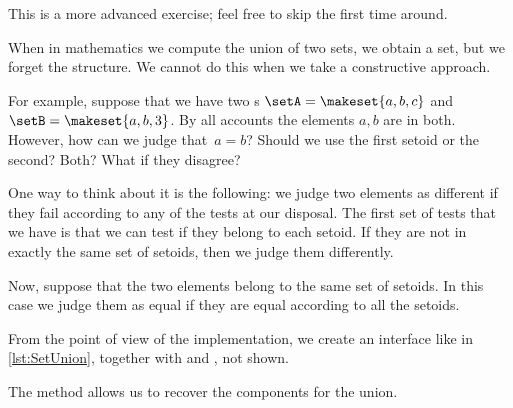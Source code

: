 \begin{remark}
    This is a more advanced exercise; feel free to skip the first time around.
\end{remark}

When in mathematics we compute the union of two sets, we obtain a set, but we forget the structure.
We cannot do this when we take a constructive approach.

For example, suppose that we have two \Setoid{}s $\setA = \makeset{a,b,c}$ and~$\setB = \makeset{a,b,3}$.
By all accounts the elements $a,b$ are in both.
However, how can we judge that~$a=b$?
Should we use the first setoid or the second?
Both?
What if they disagree?

One way to think about it is the following: we judge two elements as different if they fail according to any of the tests at our disposal. The first set of tests that we have is that we can test if they belong to each setoid.
If they are not in exactly the same set of setoids, then we judge them differently.

Now, suppose that the two elements belong to the same set of setoids. In this case we judge them as equal if they are equal according to all the setoids.





From the point of view of the implementation, we create an interface like in \cref{lst:SetUnion}, together with \EnumerableSetUnion and \FiniteSetUnion, not shown.


The method  allows us to recover the components for the union.


